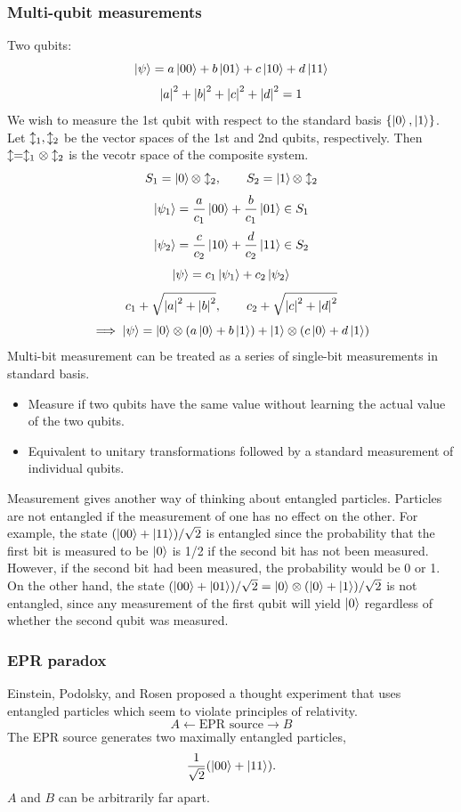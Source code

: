 \documentclass[12pt]{article}
\begin{document}
\subsubsection{Multi-qubit measurements}
Two qubits:
\[\ket{\psi} = a\ket{00} + b\ket{01} + c\ket{10} + d\ket{11}\]
\[\abs{a}^2 + \abs{b}^2 + \abs{c}^2 + \abs{d}^2 = 1\]
We wish to measure the 1st qubit with respect to the standard basis $\{\ket{0},
\ket{1}\}$. Let $\updownarrow_1, \updownarrow_2$ be the vector spaces of the 1st and 2nd qubits,
respectively. Then $\updownarrow = \updownarrow_1 \otimes \updownarrow_2$ is the vecotr space of the
composite system.
\[S_1 = \ket{0} \otimes \updownarrow_2, \qquad S_2 = \ket{1} \otimes \updownarrow_2\]
\[\ket{\psi_1} = \frac{a}{c_1}\ket{00} + \frac{b}{c_1}\ket{01} \in S_1\]
\[\ket{\psi_2} = \frac{c}{c_2}\ket{10} + \frac{d}{c_2}\ket{11} \in S_2\]
\[\ket{\psi} = c_1\ket{\psi_1} + c_2\ket{\psi_2}\]
\[c_1 + \sqrt{\abs{a}^2 + \abs{b}^2}, \qquad
c_2 + \sqrt{\abs{c}^2 + \abs{d}^2}\]
\[\implies \ket{\psi} = \ket{0} \otimes (a\ket{0} + b\ket{1})
+ \ket{1} \otimes (c\ket{0} + d\ket{1})\]
Multi-bit measurement can be treated as a series of single-bit measurements in
standard basis.
\begin{itemize}
    \item Measure if two qubits have the same value without learning the actual
        value of the two qubits.
    \item Equivalent to unitary transformations followed by a standard
        measurement of individual qubits.
\end{itemize}

Measurement gives another way of thinking about entangled particles. Particles
are not entangled if the measurement of one has no effect on the other. For
example, the state $(\ket{00} + \ket{11}) / \sqrt{2}$ is entangled since the
probability that the first bit is measured to be $\ket{0}$ is 1/2 if the second
bit has not been measured. However, if the second bit had been measured, the
probability would be 0 or 1. On the other hand, the state $(\ket{00} +
\ket{01}) / \sqrt{2} = \ket{0} \otimes (\ket{0} + \ket{1}) / \sqrt{2}$ is not
entangled, since any measurement of the first qubit will yield $\ket{0}$
regardless of whether the second qubit was measured.

\subsubsection{EPR paradox}
Einstein, Podolsky, and Rosen proposed a thought experiment that uses entangled
particles which seem to violate principles of relativity.
\[ A \longleftarrow \text{EPR source} \longrightarrow B\]
The EPR source generates two maximally entangled particles,
\[\frac{1}{\sqrt{2}} (\ket{00} + \ket{11}).\]
$A$ and $B$ can be arbitrarily far apart.
\end{document}
